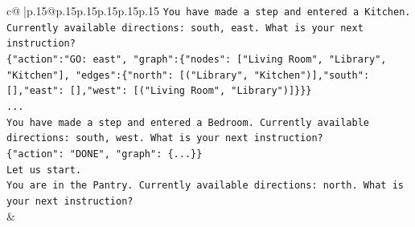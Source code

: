 \documentclass{article}
\begin{document}
{\begin{supertabular}{c@{$\;$}|p{.15\linewidth}@{}p{.15\linewidth}p{.15\linewidth}p{.15\linewidth}p{.15\linewidth}p{.15\linewidth}}
{{{\texttt{You have made a step and entered a Kitchen. Currently available directions: south, east. What is your next instruction?} \\
\texttt{\{"action":"GO: east", "graph":\{"nodes": {[}"Living Room", "Library", "Kitchen"{]}, "edges":\{"north": {[}("Library", "Kitchen"){]},"south": {[}{]},"east": {[}{]},"west": {[}("Living Room", "Library"){]}\}\}\}} \\
\texttt{...} \\
\texttt{You have made a step and entered a Bedroom. Currently available directions: south, west. What is your next instruction?} \\
\texttt{\{"action": "DONE", "graph": \{...\}\}} \\
\texttt{Let us start.} \\
\texttt{You are in the Pantry. Currently available directions: north. What is your next instruction?} \\
            }
        }
    }
    & \\ \\


\end{supertabular}}
\end{document}
